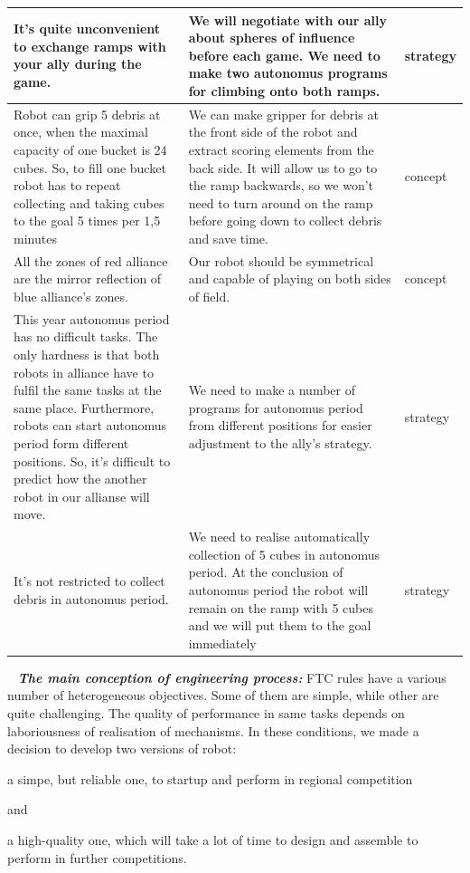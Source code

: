 \begin{table}[H]
\begin{center}
\begin{tabular}{|p{0.4\linewidth}|p{0.5\linewidth}|p{0.1\linewidth}|}
				It's quite unconvenient to exchange ramps with your ally during the game. & We will negotiate with our ally about spheres of influence before each game. We need to make two autonomus programs for climbing onto both ramps. & strategy \\
				\hline
				Robot can grip 5 debris at once, when the maximal capacity of one bucket is 24 cubes. So, to fill one bucket robot has to repeat collecting and taking cubes to the goal 5 times per 1,5 minutes & We can make gripper for debris at the front side of the robot and extract scoring elements from the back side. It will allow us to go to the ramp backwards, so we won't need to turn around on the ramp before going down to collect debris and save time. & concept \\
				\hline
				All the zones of red alliance are the mirror reflection of blue alliance's zones. & Our robot should be symmetrical and capable of playing on both sides of field. & concept \\
				\hline
				This year autonomus period has no difficult tasks. The only hardness is that both robots in alliance have to fulfil the same tasks at the same place. Furthermore, robots can start autonomus period form different positions. So, it's difficult to predict how the another robot in our allianse will move. & We need to make a number of programs for autonomus period from different positions for easier adjustment to the ally's strategy. & strategy \\
				\hline
				It's not restricted to collect debris in autonomus period. & We need to realise automatically collection of 5 cubes in autonomus period. At the conclusion of autonomus period the robot will remain on the ramp with 5 cubes and we will put them to the goal immediately & strategy \\
				\hline
			\end{tabular}
		\end{center}
	\end{table}
	
	 \newline
	\textit{\textbf{The main conception of engineering process:}} FTC rules have a various number of heterogeneous objectives. Some of them are simple, while other are quite challenging. The quality of performance in same tasks depends on laboriousness of realisation of mechanisms. \newline
	In these conditions, we made a decision to develop two versions of robot:
	\begin{enumerate*}
		\item a simpe, but reliable one, to startup and perform in regional competition
		
		and
		
		\item a high-quality one, which will take a lot of time to design and assemble to perform in further competitions.
		
	\end{enumerate*}
	
